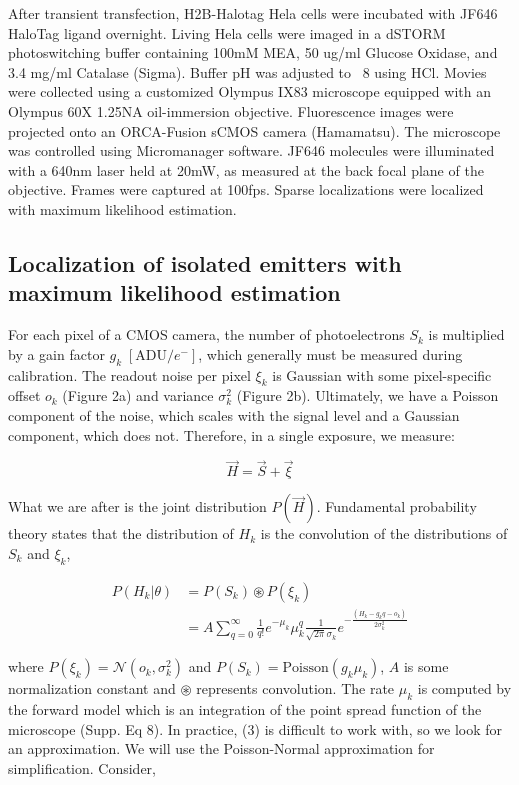 \documentclass{ucetd}
\begin{document}
After transient transfection, H2B-Halotag Hela cells were incubated with JF646 HaloTag ligand overnight. Living Hela cells were imaged in a dSTORM photoswitching buffer containing 100mM MEA, 50 ug/ml Glucose Oxidase, and 3.4 mg/ml Catalase (Sigma). Buffer pH was adjusted to ~8 using HCl. Movies were collected using a customized Olympus IX83 microscope equipped with an Olympus 60X 1.25NA oil-immersion objective. Fluorescence images were projected onto an ORCA-Fusion sCMOS camera (Hamamatsu). The microscope was controlled using Micromanager software. JF646 molecules were illuminated with a 640nm laser held at 20mW, as measured at the back focal plane of the objective.  Frames were captured at 100fps. Sparse localizations were localized with maximum likelihood estimation. 

\subsection{Localization of isolated emitters with maximum likelihood estimation}

For each pixel of a CMOS camera, the number of photoelectrons $S_{k}$ is  multiplied by a gain factor $g_{k} \;[\mathrm{ADU}/e^{-}]$, which generally must be measured during calibration. The readout noise per pixel $\xi_{k}$ is Gaussian with some pixel-specific offset $o_{k}$ (Figure 2a) and variance $\sigma_{k}^{2}$ (Figure 2b). Ultimately, we have a Poisson component of the noise, which scales with the signal level and a Gaussian component, which does not. Therefore, in a single exposure, we measure: 

\begin{equation}
\vec{H} = \vec{S} + \vec{\xi}
\end{equation}

What we are after is the joint distribution $P(\vec{H})$. Fundamental probability theory states that the distribution of $H_{k}$ is the convolution of the distributions of $S_{k}$ and $\xi_{k}$,

\begin{align}
P(H_{k}|\theta) &= P(S_{k})\circledast P(\xi_{k})\\
&= A\sum_{q=0}^{\infty} \frac{1}{q!}e^{-\mu_{k}}\mu_{k}^{q}\frac{1}{\sqrt{2\pi}\sigma_{k}}e^{-\frac{(H_{k}-g_{k}q-o_{k})}{2\sigma_{k}^{2}}}
\end{align}

where $P(\xi_{k}) = \mathcal{N}(o_{k},\sigma_{k}^{2})$ and $P(S_{k}) = \mathrm{Poisson}(g_{k}\mu_{k})$,  $A$ is some normalization constant and $\circledast$ represents convolution. The rate $\mu_{k}$ is computed by the forward model which is an integration of the point spread function of the microscope (Supp. Eq 8). In practice, (3) is difficult to work with, so we look for an approximation. We will use the Poisson-Normal approximation for simplification. Consider,
\end{document}
